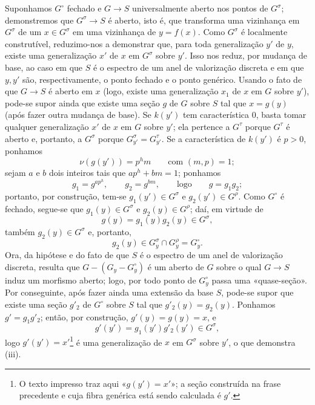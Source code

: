 Suponhamos $G^\circ$ fechado e $G\longrightarrow S$ universalmente aberto nos
pontos de $G^\sigma$; demonstremos que $G^\sigma\longrightarrow S$ é aberto,
isto é, que transforma uma vizinhança em $G^\sigma$ de um $x\in G^\sigma$
em uma vizinhança de $y=f(x)$. Como $G^\sigma$ é localmente construtível,
reduzimo-nos a demonstrar que, para toda generalização $y'$ de $y$, existe uma
generalização $x'$ de $x$ em $G^\sigma$ sobre $y'$. Isso nos reduz, por
mudança de base, ao caso em que $S$ é o espectro de um anel de valorização
discreta e em que $y,y'$ são, respectivamente, o ponto fechado e o ponto
genérico. Usando o fato de que $G\longrightarrow S$ é aberto em $x$ (logo,
existe uma generalização $x_1$ de $x$ em $G$ sobre $y'$), pode-se supor ainda
que existe uma seção $g$ de $G$ sobre $S$ tal que $x=g(y)$ (após fazer outra
mudança de base). Se $k(y')$ tem característica 0, basta tomar qualquer
generalização $x'$ de $x$ em $G$ sobre $y'$; ela pertence a $G^\tau$ porque
$G^\tau$ é aberto e, portanto, a $G^\sigma$ porque
$G_{y'}^\sigma=G_{y'}^\tau$. Se a característica de $k(y')$ é $p>0$,
ponhamos
\[
\nu(g(y'))=p^hm\qquad\text{com }(m,p)=1 ;
\]
sejam $a$ e $b$ dois inteiros tais que $ap^h+bm=1$; ponhamos
\[
g_1=g^{ap^h},\qquad g_2=g^{bm},\qquad\text{logo}\qquad g=g_1g_2 ;
\]
portanto, por construção, tem-se $g_1(y')\in G^\sigma$ e
$g_2(y')\in G^\rho$. Como $G^\circ$ é fechado, segue-se que
$g_1(y)\in G^\sigma$ e $g_2(y)\in G^\rho$; daí, em virtude de
\[
g(y)=g_1(y)g_2(y)\in G^\sigma,
\]
também $g_2(y)\in G^\sigma$ e, portanto,
\[
g_2(y)\in G_y^\sigma\cap G_y^\rho=G_y^\circ.
\]
Ora, da hipótese e do fato de que $S$ é o espectro de um anel de valorização
discreta, resulta que $G-(G_y-G_y^\circ)$ é um aberto de $G$ sobre o qual
$G\longrightarrow S$ induz um morfismo aberto; logo, por todo ponto de
$G_y^\circ$ passa uma «quase-seção». Por conseguinte, após fazer ainda uma
extensão da base $S$, pode-se supor que existe uma seção $g'_2$ de $G^\circ$
sobre $S$ tal que $g'_2(y)=g_2(y)$. Ponhamos $g'=g_1g'_2$; então, por
construção, $g'(y)=g(y)=x$, e
\[
g'(y')=g_1(y')g'_2(y')\in G^\sigma,
\]
logo $g'(y')=x'$\footnote{O texto impresso traz aqui «$g(y')=x'$»; a seção
construída na frase precedente e cuja fibra genérica está sendo calculada é
$g'$.} é uma generalização de $x$ em $G^\sigma$ sobre $y'$, o que demonstra
(iii).

